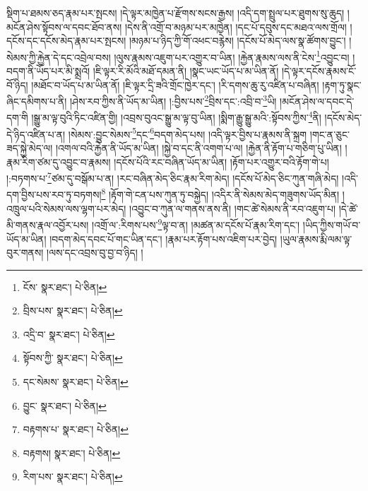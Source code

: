 སྡིག་པ་ཐམས་ཅད་རྣམ་པར་སྤངས། །དེ་ལྟར་མཁྱེན་པ་རྫོགས་སངས་རྒྱས། །འདི་དག་སྤྲུལ་པར་ཐུགས་སུ་ཆུད། །མངོན་ཤེས་སྟོབས་ལ་དབང་ཐོབ་ནས། །དེས་ནི་འགྲོ་བ་མཉམ་པར་མཁྱེན། །དང་པོ་དབུས་དང་མཐའ་ལས་གྲོལ། །དངོས་དང་དངོས་མེད་རྣམ་པར་སྤངས། །མཉམ་པ་ཉིད་ཀྱི་གོ་འཕང་བརྙེས། །དངོས་པོ་མེད་ལས་སྣ་ཚོགས་བྱུང་། །སེམས་ཀྱི་རྐྱེན་དེ་དང་འབྲེལ་བས། །ལུས་རྣམས་འཇུག་པར་འགྱུར་བ་ཡིན། །རྐྱེན་རྣམས་ལས་ནི་ངེས་\footnote{ངོས་  སྣར་ཐང་།  པེ་ཅིན། }འབྱུང་བ། །བདག་ནི་ཡོད་པར་མི་སྨྲའོ། །ཇི་ལྟར་རི་མོའི་མཐོ་དམན་ནི། །སྣང་ཡང་ཡོད་པ་མ་ཡིན་ནོ། །དེ་ལྟར་དངོས་རྣམས་ངོ་བོ་ཉིད། །མཐོང་བ་ཡོད་པ་མ་ཡིན་ནོ། །ཇི་ལྟར་དྲི་ཟའི་གྲོང་ཁྱེར་དང་། །རི་དགས་ཆུ་རུ་འཛིན་པ་བཞིན། །རྟག་ཏུ་སྣང་ཞིང་དམིགས་པ་ནི། །ཤེས་རབ་ཀྱིས་ནི་ཡོད་མ་ཡིན། །:བྱིས་པས་\footnote{བྲིས་པས་  སྣར་ཐང་།  པེ་ཅིན། }བྲིས་དང་:འབྲི་བ་\footnote{འདྲི་བ་  སྣར་ཐང་།  པེ་ཅིན། }ཡི། །མངོན་ཤེས་ལ་དབང་དེ་དག་གི །སྒྱུ་མ་ལྟ་བུའི་ཏིང་འཛིན་གྱི། །འབྲས་བུའང་སྒྱུ་མ་ལྟ་བུ་ཡིན། །སྨིག་རྒྱུ་སྒྱུ་མའི་:སྟོབས་ཀྱིས་\footnote{སྟོབས་ཀྱི་  སྣར་ཐང་།  པེ་ཅིན། }ནི། །དངོས་མེད་དེ་ཉིད་འཛིན་པ་ན། །སེམས་:བྱུང་སེམས་\footnote{དང་སེམས་  སྣར་ཐང་།  པེ་ཅིན། }དང་\footnote{བྱུང་  སྣར་ཐང་།  པེ་ཅིན། }བདག་མེད་པས། །འདི་ལྟར་བྱིས་པ་རྣམས་ནི་སྐྲག །གང་ན་ཅུང་ཟད་སྐྱེ་མེད་ལ། །འགལ་བའི་རྐྱེན་ནི་ཡོད་མ་ཡིན། །སྐྱེ་བ་དང་ནི་འགག་པ་ལ། །རྐྱེན་ནི་རྟོག་པ་གཅིག་པུ་ཡིན། །རྣམ་རིག་ཙམ་དུ་འབྱུང་བ་རྣམས། །དངོས་པོའི་རང་བཞིན་ཡོད་མ་ཡིན། །རྟོག་པར་འགྱུར་བའི་རྟོག་གེ་པ། །:བཏགས་པ་\footnote{བརྟགས་པ་  སྣར་ཐང་།  པེ་ཅིན། }ཙམ་དུ་བསྒོམ་པ་ན། །རང་བཞིན་མེད་ཅིང་རྣམ་རིག་མེད། །དངོས་པོ་མེད་ཅིང་ཀུན་གཞི་མེད། །འདི་དག་བྱིས་པས་རབ་ཏུ་བཏགས།\footnote{བརྟགས།  སྣར་ཐང་།  པེ་ཅིན། } །རྟོག་གེ་ངན་པས་ཀུན་ཏུ་བསྐྱེད། །འདིར་ནི་སེམས་མེད་གཟུགས་ཡོད་མིན། །འཁྲུལ་པའི་སེམས་ལས་ལྷག་པར་མེད། །འབྱུང་བ་ཀུན་ལ་གནས་ནས་ནི། །གང་ཚེ་སེམས་ནི་རབ་འཇུག་པ། །དེ་ཚེ་མི་གནས་རྣལ་འབྱོར་པས། །འགྲོ་ལ་:རིགས་པས་\footnote{རིག་པས་  སྣར་ཐང་།  པེ་ཅིན། }ལྟ་བ་ན། །མཚན་མ་དངོས་པོ་རྣམ་རིག་དང་། །ཡིད་ཀྱིས་གཡོ་བ་ཡོད་མ་ཡིན། །བདག་མེད་དབང་པོ་གང་ཡིན་དང་། །རྣམ་པར་རྟོག་པས་འཇིག་པར་བྱེད། །ཡུལ་རྣམས་རྨི་ལམ་ལྟ་བུར་གནས། །ལས་དང་འབྲས་བུ་བྱ་བ་ཉིད། །
